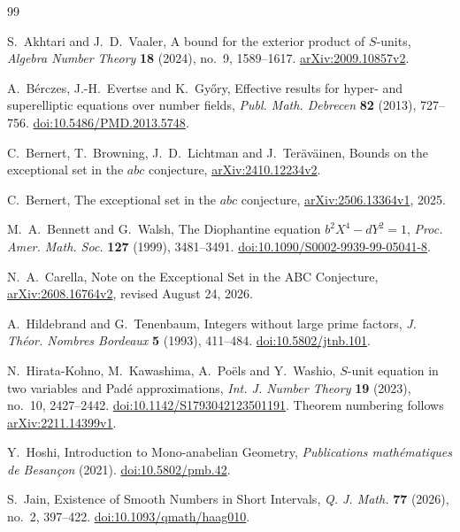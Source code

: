 \documentclass[11pt]{amsart}
\theoremstyle{definition}
\theoremstyle{remark}
\begin{document}
\begin{thebibliography}{99}
\raggedright
\raggedbottom

S.~Akhtari and J.~D.~Vaaler, A bound for the exterior product of $S$-units,
\emph{Algebra Number Theory} \textbf{18} (2024), no.~9, 1589--1617.
\href{https://arxiv.org/abs/2009.10857v2}{arXiv:2009.10857v2}.

A.~B\'erczes, J.-H.~Evertse and K.~Gy\H{o}ry,
Effective results for hyper- and superelliptic equations over number fields,
\emph{Publ. Math. Debrecen} \textbf{82} (2013), 727--756.
\href{https://doi.org/10.5486/PMD.2013.5748}{doi:10.5486/PMD.2013.5748}.

C.~Bernert, T.~Browning, J.~D.~Lichtman and J.~Ter\"av\"ainen,
Bounds on the exceptional set in the $abc$ conjecture,
\href{https://arxiv.org/abs/2410.12234v2}{arXiv:2410.12234v2}.

C.~Bernert, The exceptional set in the $abc$ conjecture,
\href{https://arxiv.org/abs/2506.13364v1}{arXiv:2506.13364v1}, 2025.

M.~A.~Bennett and G.~Walsh, The Diophantine equation $b^2X^4-dY^2=1$,
\emph{Proc. Amer. Math. Soc.} \textbf{127} (1999), 3481--3491.
\href{https://doi.org/10.1090/S0002-9939-99-05041-8}{doi:10.1090/S0002-9939-99-05041-8}.

N.~A.~Carella, Note on the Exceptional Set in the ABC Conjecture,
\href{https://arxiv.org/abs/2608.16764v2}{arXiv:2608.16764v2},
revised August 24, 2026.

A.~Hildebrand and G.~Tenenbaum, Integers without large prime factors,
\emph{J. Th\'eor. Nombres Bordeaux} \textbf{5} (1993), 411--484.
\href{https://doi.org/10.5802/jtnb.101}{doi:10.5802/jtnb.101}.

N.~Hirata-Kohno, M.~Kawashima, A.~Po\"els and Y.~Washio,
$S$-unit equation in two variables and Pad\'e approximations,
\emph{Int. J. Number Theory} \textbf{19} (2023), no.~10, 2427--2442.
\href{https://doi.org/10.1142/S1793042123501191}{doi:10.1142/S1793042123501191}.
Theorem numbering follows
\href{https://arxiv.org/abs/2211.14399v1}{arXiv:2211.14399v1}.

Y.~Hoshi, Introduction to Mono-anabelian Geometry,
\emph{Publications math\'ematiques de Besan\c con} (2021).
\href{https://doi.org/10.5802/pmb.42}{doi:10.5802/pmb.42}.

S.~Jain, Existence of Smooth Numbers in Short Intervals,
\emph{Q. J. Math.} \textbf{77} (2026), no.~2, 397--422.
\href{https://doi.org/10.1093/qmath/haag010}{doi:10.1093/qmath/haag010}.


\end{thebibliography}
\end{document}

